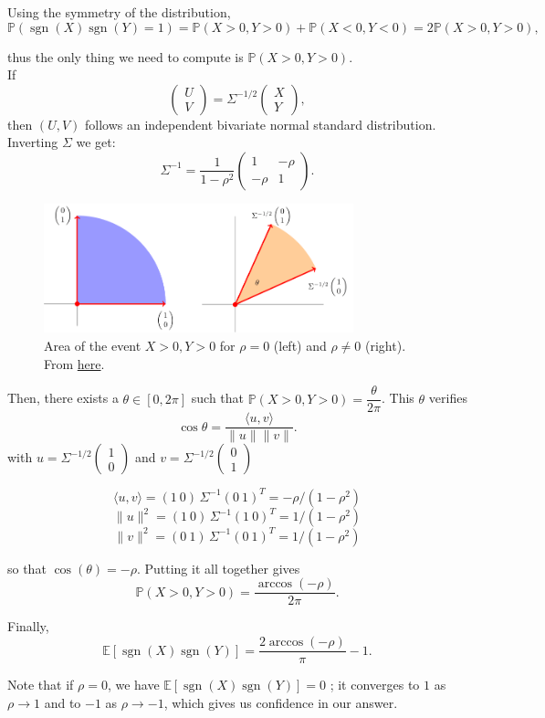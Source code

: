 Using the symmetry of the distribution, $$\mathbb{P}(\operatorname{sgn}(X)\operatorname{sgn}(Y)=1) = \mathbb{P}(X>0,Y>0) + \mathbb{P}(X<0,Y<0) = 2\mathbb{P}(X>0,Y>0),$$

thus the only thing we need to compute is $\mathbb{P}(X>0,Y>0)$.\\

If $$\begin{pmatrix}U\\V\end{pmatrix} = \Sigma^{-1/2}\begin{pmatrix}X\\Y\end{pmatrix},$$
then $(U,V)$ follows an independent bivariate normal standard distribution. Inverting $\Sigma$ we get:
$$\Sigma^{-1} = \frac1{1-\rho^2}\begin{pmatrix}
1 & -\rho\\ -\rho & 1
\end{pmatrix}.$$

\begin{figure}[H]
    \centering
    \includegraphics[width=0.8\textwidth]{images/corr_biv_normal.png}
    \caption{Area of the event $X>0,Y>0$ for $\rho = 0$ (left) and $\rho \ne 0$ (right). From \href{https://math.stackexchange.com/questions/1687795/correlated-joint-normal-distribution-calculating-a-probability}{here}.}
\end{figure}

Then, there exists a $\theta \in [0,2\pi]$ such that $\mathbb{P}(X>0,Y>0) = \dfrac{\theta}{2\pi}$. This $\theta$ verifies $$\cos{\theta} = \dfrac{\langle u,v\rangle}{\|u\| \|v\|}.$$ with $u = \Sigma^{-1/2} \begin{pmatrix}1\\0\end{pmatrix}$ and $v = \Sigma^{-1/2} \begin{pmatrix}0\\1\end{pmatrix}$


$$\langle u,v\rangle = (1\ 0)\,\Sigma^{-1}(0\ 1)^T=-\rho/(1-\rho^2)$$
$$\|u\|^2=(1\ 0)\,\Sigma^{-1}(1\ 0)^T=1/(1-\rho^2)$$
$$\|v\|^2=(0\ 1)\,\Sigma^{-1}(0\ 1)^T=1/(1-\rho^2)$$

so that $\cos(\theta)=-\rho.$ Putting it all together gives 
$$\mathbb{P}(X>0,Y>0)=\dfrac{\arccos(-\rho)}{ 2\pi}.$$ 

Finally, $$\mathbb{E}[\operatorname{sgn}(X)\operatorname{sgn}(Y)] = \dfrac{2\arccos(-\rho)}{\pi} - 1.$$

Note that if $\rho=0$, we have $\mathbb{E}[\operatorname{sgn}(X)\operatorname{sgn}(Y)]=0$ ; it converges to $1$ as $\rho \longrightarrow 1$ and to $-1$ as $\rho \longrightarrow -1$, which gives us confidence in our answer.
